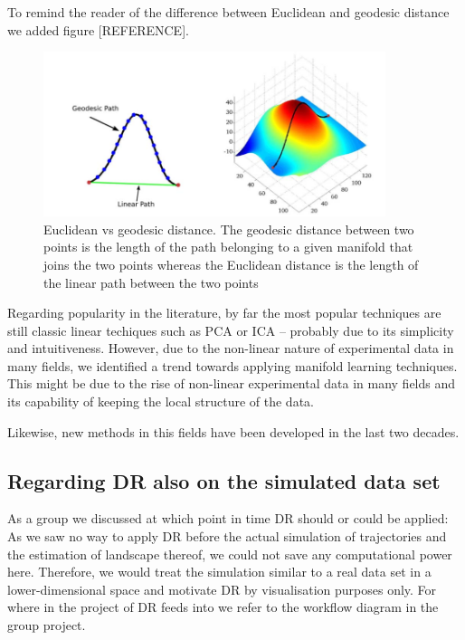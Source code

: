 \documentclass[journal, a4paper]{IEEEtran}
\begin{document}
To remind the reader of the difference between Euclidean and geodesic distance we added figure [REFERENCE].
\begin{figure}[H]
	\centering
	\includegraphics[width=10cm]{img/geodesic_euclidean_distance}
	\caption{Euclidean vs geodesic distance. The geodesic distance between two points is the length of the path belonging to a given manifold that joins the two points whereas the Euclidean distance is the length of the linear path between the two points \cite{euclidean}}\label{distance}
\end{figure}



Regarding popularity in the literature, %
by far the most popular techniques are still classic linear techiques such as PCA or ICA -- probably due to its simplicity and intuitiveness. However, due to the non-linear nature of experimental data in many fields, we identified a trend towards applying manifold learning techniques. This might be due to the rise of non-linear experimental data in many fields and its capability of keeping the local structure of the data.

Likewise, new methods in this fields have been developed in the last two decades.



\subsection{Regarding DR also on the simulated data set}

As a group we discussed at which point in time DR should or could be applied: As we saw no way to apply DR before the actual simulation of trajectories and the estimation of landscape thereof, we could not save any computational power here. Therefore, we would treat the simulation similar to a real data set in a lower-dimensional space and motivate DR by visualisation purposes only. For where in the project of DR feeds into we refer to the workflow diagram in the group project.\\
\end{document}
